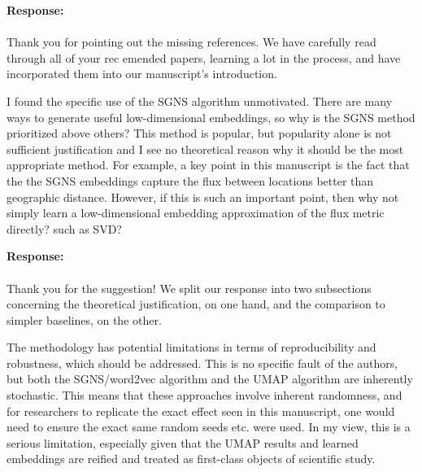 \documentclass[12pt,a4paper]{article}
\newcommand{\response}[1]{{\noindent \textbf{Response:} \\ \\ \noindent #1}}
\newcommand{\rcomment}[1]{%
\vspace{10pt}
\begin{tcolorbox}[colback=black!3,colframe=white!45!black, left=0pt, right=0pt, top=0pt, bottom=0pt, arc=0pt,outer arc=0pt, grow to left by=-0.5cm,grow to right by=-0.5cm]
#1
\end{tcolorbox}
}
\begin{document}
\response{Thank you for pointing out the missing references. 
We have carefully read through all of your rec emended papers, learning a lot in the process, and have incorporated them into our manuscript's introduction.
}

\rcomment{
I found the specific use of the SGNS algorithm unmotivated. There are many ways to generate useful low-dimensional embeddings, so why is the SGNS method prioritized above others? This method is popular, but popularity alone is not sufficient justification and I see no theoretical reason why it should be the most appropriate method. For example, a key point in this manuscript is the fact that the the SGNS embeddings capture the flux between locations better than geographic distance. However, if this is such an important point, then why not simply learn a low-dimensional embedding approximation of the flux metric directly? such as SVD?
}

\response{Thank you for the suggestion! 
We split our response into two subsections concerning the theoretical justification, on one hand, and the comparison to simpler baselines, on the other. 
}



\rcomment{%
The methodology has potential limitations in terms of reproducibility and robustness, which should be addressed. This is no specific fault of the authors, but both the SGNS/word2vec algorithm and the UMAP algorithm are inherently stochastic. This means that these approaches involve inherent randomness, and for researchers to replicate the exact effect seen in this manuscript, one would need to ensure the exact same random seeds etc. were used. In my view, this is a serious limitation, especially given that the UMAP results and learned embeddings are reified and treated as first-class objects of scientific study. 
}
\end{document}
